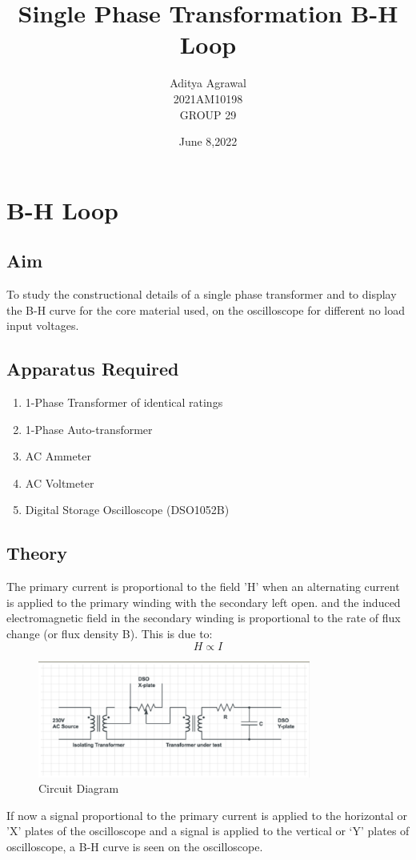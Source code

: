 \documentclass{article}
\title{Single Phase Transformation B-H Loop}
\author{Aditya Agrawal\\2021AM10198\\GROUP 29}
\date{June 8,2022}
\begin{document}
\maketitle
\tableofcontents
{}
\newpage

\section{B-H Loop}
\subsection{Aim}
To study the constructional details of a single phase transformer and to display
the B-H curve for the core material used, on the oscilloscope for different no
load input voltages.

\subsection{Apparatus Required}
\begin{enumerate}
    \item 1-Phase Transformer of identical ratings
    \item 1-Phase Auto-transformer
    \item AC Ammeter
    \item AC Voltmeter
    \item Digital Storage Oscilloscope (DSO1052B)
\end{enumerate}

\subsection{Theory}
The primary current is proportional to the field 'H' when an alternating current is applied to the primary winding with the secondary left open. and the induced electromagnetic field in the secondary winding is proportional to the rate of flux change (or flux density B). This is due to:\\
\begin{equation}
    H \propto I
\end{equation}
\begin{figure}[h!]
    \centering
    \includegraphics[width=0.8\textwidth]{i1.png}
    \caption{Circuit Diagram}
\end{figure}
If now a signal proportional to the primary current is applied to the horizontal or ’X’ plates of the oscilloscope and a signal is applied to the vertical or ‘Y’ plates of oscilloscope, a B-H curve is seen on the oscilloscope.
\end{document}
